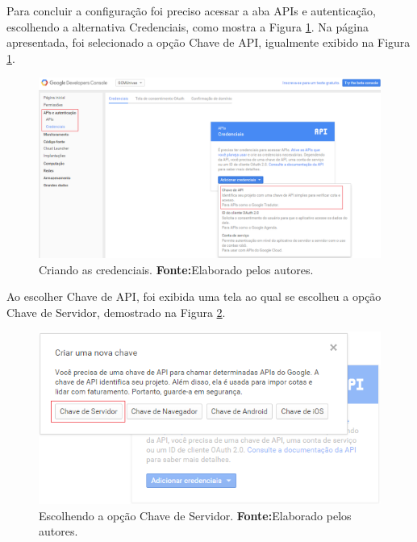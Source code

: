 	\pagebreak
	
	\par Para concluir a configuração foi preciso acessar a aba APIs e
autenticação, escolhendo a alternativa Credenciais, como mostra a Figura
\ref{fig:gcm6}. Na página apresentada, foi selecionado a opção Chave de API,
igualmente exibido na Figura \ref{fig:gcm6}.
	
	\begin{figure}[h!] 
		\centerline{\includegraphics[scale=0.4]{./imagens/2_q_metodologico/4_procedimentos_resultados/41_gcm/gcm6.png}}
		\caption[Criando as credenciais]{Criando as credenciais.
		\textbf{Fonte:}Elaborado pelos autores.}
		\label{fig:gcm6}
	\end{figure}
	
	\par Ao escolher Chave de API, foi exibida uma tela ao qual se escolheu a opção
Chave de Servidor, demostrado na Figura \ref{fig:gcm7}.
	
	\begin{figure}[h!] 
		\centerline{\includegraphics[scale=.8]{./imagens/2_q_metodologico/4_procedimentos_resultados/41_gcm/gcm7.png}}
		\caption[Escolhendo a opção Chave de Servidor]{Escolhendo a opção Chave de
		Servidor.
		\textbf{Fonte:}Elaborado pelos autores.}
		\label{fig:gcm7}
	\end{figure}
	
